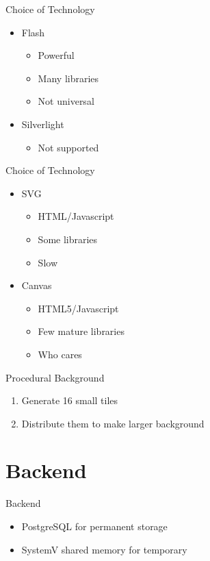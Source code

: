 \begin{frame}{Choice of Technology}
  \begin{itemize}
    \item Flash
      \begin{itemize}
        \item Powerful
        \item Many libraries
        \item Not universal
      \end{itemize}
    \item Silverlight
      \begin{itemize}
        \item Not supported
      \end{itemize}
  \end{itemize}
\end{frame}

\begin{frame}{Choice of Technology}
  \begin{itemize}
    \item SVG
      \begin{itemize}
        \item HTML/Javascript
        \item Some libraries
        \item Slow
      \end{itemize}
    \item Canvas
      \begin{itemize}
        \item HTML5/Javascript
        \item Few mature libraries
        \item Who cares
      \end{itemize}
  \end{itemize}
\end{frame}

\begin{frame}{Procedural Background}
  \begin{enumerate}
    \item Generate 16 small tiles
    \item Distribute them to make larger background
  \end{enumerate}
\end{frame}

\section{Backend}
\begin{frame}{Backend}
  \begin{itemize}
    \item PostgreSQL for permanent storage
    \item SystemV shared memory for temporary
  \end{itemize}
\end{frame}

